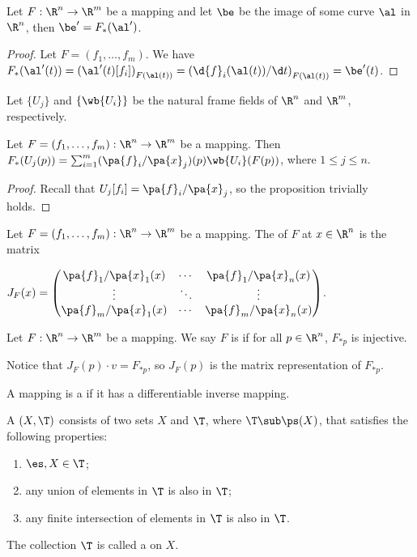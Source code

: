\documentclass[10pt]{article}
\begin{document}
\begin{proposition}
    Let $F:{\R}^{n}\to{\R}^{m}$ be a mapping and let $\be$ be the image of some curve $\al$ in ${\R}^{n}$, then $\be'={F}_{*}(\al')$.
\end{proposition}
\begin{proof}
    Let $F=({f}_{1},\dots,{f}_{m})$. We have ${F}_{*}(\al'(t))={(\al'(t)[{f}_{i}])}_{F(\al(t))}={(\d{f}_{i}(\al(t))/\d t)}_{F(\al(t))}=\be'(t)$.
\end{proof}
\par
Let $\{{U}_{j}\}$ and $\{\wb{{U}_{i}}\}$ be the natural frame fields of ${\R}^{n}$ and ${\R}^{m}$, respectively.
\begin{proposition}
    Let $F=({f}_{1},\dots,{f}_{m}):{\R}^{n}\to{\R}^{m}$ be a mapping. Then ${F}_{*}({U}_{j}(p))={\sum}_{i=1}^{m}(\pa{f}_{i}/\pa{x}_{j})(p)\wb{{U}_{i}}(F(p))$, where $1\le j\le n$.
\end{proposition}
\begin{proof}
    Recall that ${U}_{j}[{f}_{i}]=\pa{f}_{i}/\pa{x}_{j}$, so the proposition trivially holds.
\end{proof}
\begin{definition}
    Let $F=({f}_{1},\dots,{f}_{m}):{\R}^{n}\to{\R}^{m}$ be a mapping. The  of $F$ at $x\in{\R}^{n}$ is the matrix
    \begin{center}
        ${J}_{F}(x)=\begin{pmatrix}
            \pa{f}_{1}/\pa{x}_{1}(x) & \cdots & \pa{f}_{1}/\pa{x}_{n}(x) \\
            \vdots & \ddots & \vdots \\
            \pa{f}_{m}/\pa{x}_{1}(x) & \cdots & \pa{f}_{m}/\pa{x}_{n}(x)
        \end{pmatrix}$.
    \end{center}
\end{definition}
\begin{definition}
    Let $F:{\R}^{n}\to{\R}^{m}$ be a mapping. We say $F$ is  if for all $p\in{\R}^{n}$, ${F}_{*p}$ is injective.
\end{definition}
\par
Notice that ${J}_{F}(p)\cdot v={F}_{*p}$, so ${J}_{F}(p)$ is the matrix representation of ${F}_{*p}$.
\begin{definition}
    A mapping is a  if it has a differentiable inverse mapping.
\end{definition}
\begin{definition}
    A  $(X,\T)$ consists of two sets $X$ and $\T$, where $\T\sub\ps(X)$, that satisfies the following properties:
    \begin{enumerate}
        \item $\es,X\in\T$;
        \item any union of elements in $\T$ is also in $\T$;
        \item any finite intersection of elements in $\T$ is also in $\T$.
    \end{enumerate}
    The collection $\T$ is called a  on $X$.
\end{definition}
\end{document}
